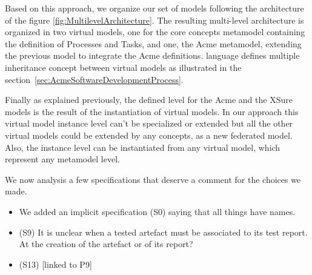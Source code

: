 Based on this approach, we organize our set of models following the architecture of the figure \ref{fig:MultilevelArchitecture}. The resulting multi-level architecture is organized in two virtual models, one for the core concepts metamodel containing the definition of Processes and Tasks, and one, the Acme metamodel, extending the previous model to integrate the Acme definitions. \FML language defines multiple inheritance concept between virtual models as illustrated in the section~\ref{sec:AcmeSoftwareDevelopmentProcess}.

Finally as explained previously, the defined level for the Acme  and the XSure models is the result of the instantiation of virtual models. In our approach this virtual model instance level can't be specialized or extended but all the other virtual models could be extended by any concepts, as a new federated model. 
Also, the instance level can be instantiated from any virtual model, which represent any metamodel level. 


We now analysis a few specifications that deserve a comment for the choices we made. 

\begin{itemize}
    \item We added an implicit specification (S0) saying that all things have names.
    \item (S9) It is unclear when a tested artefact must be associated to its test report. At the creation of the artefact or of its report? 
    \item (S13) [linked to P9] 
\end{itemize} 



